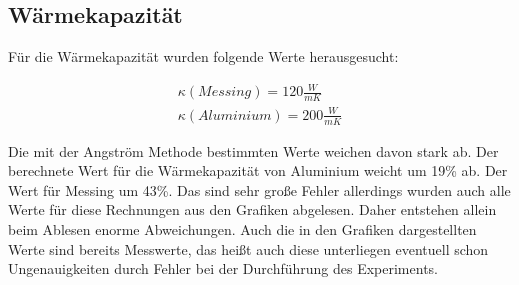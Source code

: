 \subsection{Wärmekapazität}

Für die Wärmekapazität wurden folgende Werte herausgesucht:

\begin{align*}
    \kappa (Messing) = 120 \frac{W}{mK} \\
    \kappa (Aluminium) = 200 \frac{W}{mK}
\end{align*}

Die mit der Angström Methode bestimmten Werte weichen davon stark ab. Der berechnete Wert für die Wärmekapazität von Aluminium weicht um 19\% ab. Der Wert für Messing um 43\%. Das sind sehr große Fehler allerdings wurden auch alle Werte für diese Rechnungen aus den Grafiken abgelesen. Daher entstehen allein beim Ablesen enorme Abweichungen. Auch die in den Grafiken dargestellten Werte sind bereits Messwerte, das heißt auch diese unterliegen eventuell schon Ungenauigkeiten durch Fehler bei der Durchführung des Experiments.